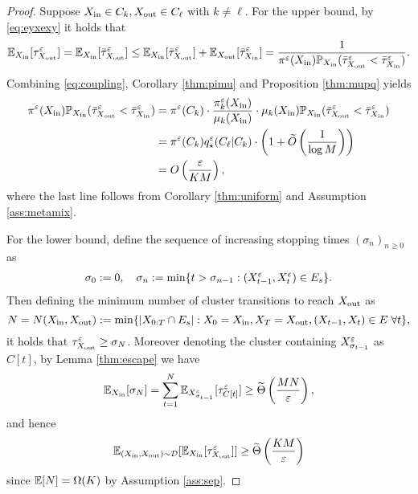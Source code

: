 \begin{proof}
Suppose $X_{\operatorname{in}}\in C_k, X_{\operatorname{out}}\in C_\ell$ with $k\neq\ell$. For the upper bound, by \eqref{eq:eyxexy} it holds that
\begin{align*}
\mathbb{E}_{X_{\operatorname{in}}}[\tau_{X_{\operatorname{out}}}^\varepsilon] = \mathbb{E}_{X_{\operatorname{in}}}[\bar{\tau}_{X_{\operatorname{out}}}^\varepsilon] \le \mathbb{E}_{X_{\operatorname{in}}}[\bar{\tau}_{X_{\operatorname{out}}}^\varepsilon] + \mathbb{E}_{X_{\operatorname{out}}}[\bar{\tau}_{X_{\operatorname{in}}}^\varepsilon]= \frac{1}{\pi^\varepsilon(X_{\operatorname{in}}) \mathbb{P}_{X_{\operatorname{in}}}(\bar{\tau}_{X_{\operatorname{out}}}^\varepsilon < \bar{\tau}_{X_{\operatorname{in}}}^\varepsilon)}.
\end{align*}
Combining \eqref{eq:coupling}, Corollary \ref{thm:pimu} and Proposition \ref{thm:mupq} yields
\begin{align*}
\pi^\varepsilon(X_{\operatorname{in}}) \mathbb{P}_{X_{\operatorname{in}}}(\bar{\tau}_{X_{\operatorname{out}}}^\varepsilon < \bar{\tau}_{X_{\operatorname{in}}}^\varepsilon) &= \pi^\varepsilon(C_k)\cdot \frac{\pi_k^\varepsilon(X_{\operatorname{in}})}{\mu_k(X_{\operatorname{in}})} \cdot \mu_k(X_{\operatorname{in}})\mathbb{P}_{X_{\operatorname{in}}}(\bar{\tau}_{X_{\operatorname{out}}}^\varepsilon< \bar{\tau}_{X_{\operatorname{in}}}^\varepsilon) \\
&= \pi^\varepsilon(C_k) q_\star^\varepsilon(C_\ell|C_k) \cdot \left(1+\widetilde{O}\left(\frac{1}{\log M}\right)\right) \\
&= O\left(\frac{\varepsilon}{KM}\right),
\end{align*}
where the last line follows from Corollary \ref{thm:uniform} and Assumption \ref{ass:metamix}.

For the lower bound, define the sequence of increasing stopping times $(\sigma_n)_{n\ge 0}$ as
\begin{align*}
\sigma_0:=0,\quad \sigma_n := \min\{t>\sigma_{n-1}: (X_{t-1}^\varepsilon,X_t^\varepsilon)\in E_s\}.
\end{align*}
Then defining the minimum number of cluster transitions to reach $X_{\operatorname{out}}$ as
\begin{equation*}
N=N(X_{\operatorname{in}},X_{\operatorname{out}}):=\min\{\left\lvert X_{0:T}\cap E_s\right\rvert:X_0=X_{\operatorname{in}},X_T=X_{\operatorname{out}}, (X_{t-1},X_t)\in E \;\forall t\},
\end{equation*}
it holds that $\tau_{X_{\operatorname{out}}}^\varepsilon \ge\sigma_N$. Moreover denoting the cluster containing $X_{\sigma_{t-1}}^\varepsilon$ as $C[t]$, by Lemma \ref{thm:escape} we have
\begin{align*}
\mathbb{E}_{X_{\operatorname{in}}}[\sigma_N] = \sum_{t=1}^N \mathbb{E}_{X_{\sigma_{t-1}}^\varepsilon}[\tau_{C[t]}^\varepsilon] \ge \widetilde{\Theta}\left(\frac{MN}{\varepsilon}\right),
\end{align*}
and hence
\begin{equation*}
\mathbb{E}_{(X_{\operatorname{in}},X_{\operatorname{out}})\sim\mathcal{D}}[\mathbb{E}_{X_{\operatorname{in}}}[\tau_{X_{\operatorname{out}}}^\varepsilon]] \ge \widetilde{\Theta}\left(\frac{KM}{\varepsilon}\right)
\end{equation*}
since $\mathbb{E}[N]=\Omega(K)$ by Assumption \ref{ass:sep}.
\end{proof}


